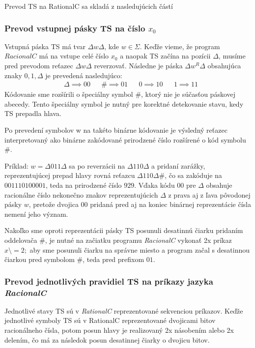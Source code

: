 \documentclass[10pt]{article}
\begin{document}
Prevod TS na RationalC sa skladá z nasledujúcich částí
\subsubsection*{Prevod vstupnej pásky TS na číslo $x_0$}
    Vstupná páska TS má tvar $\Delta w \Delta$, kde $w \in \Sigma$. Keďže vieme, že program
    $RacionalC$ má na vstupe celé číslo $x_0$ a naopak TS začína na pozícii $\Delta$, musíme
    pred prevodom reťazec $\Delta w \Delta$ reverzovať. 
    Následne je páska $\Delta w^R \Delta$ obsahujúca znaky $0,1,\Delta$ je prevedená nasledujúco:
    \begin{align*}
        &\Delta \implies 00 &  & \#  \implies 01 &
        &0 \implies 10 &  &1 \implies 11 
    \end{align*}
    Kódovanie sme rozšírili o špeciálny symbol $\#$, ktorý nie je súčasťou páskovej abecedy.
    Tento špeciálny symbol je nutný pre korektné detekovanie stavu, kedy TS prepadla hlava.

    Po prevedení symbolov w na takéto binárne kódovanie je výsledný reťazec interpretovaný ako
    binárne zakódované prirodzené číslo rozšírené o kód symbolu $\#$.

    Príklad: $w = \Delta011\Delta$ sa po reverzácii na $\Delta110\Delta$ a pridaní zarážky,
    reprezentujúcej prepad hlavy rovná reťazcu $\Delta110\Delta \#$, čo sa zakóduje na $00 11 10 10 00
    01$, teda na prirodzené číslo $929$. Vďaka kódu $00$ pre $\Delta$ obsahuje racionálne číslo nekonečno znakov
    reprezentujúcich $\Delta$ z prava aj z ľava pôvodonej pásky $w$, pretože dvojica 00 pridaná
    pred aj na koniec binárnej reprezentácie čísla nemení jeho význam.

    Nakoľko sme oproti reprezentácii pásky TS posunuli desatinnú čiarku pridaním oddelovača $\#$, je
    nutné na začiatku programu \textit{RacionalC} vykonať 2x príkaz $x \setminus = 2;$ aby sme posunuli čiarku na
    správne miesto a program začal s desatinnou čiarkou pred symbolom $\#$, teda pred prefixom $01$.

\subsubsection*{Prevod jednotlivých pravidiel TS na príkazy jazyka \textit{RacionalC}}
    Jednotlivé stavy TS sú v \textit{RationalC} reprezentované sekvenciou príkazov. 
    Keďže jednotlivé symboly TS sú v RationalC reprezentované dvojicami bitov racionálneho čísla, potom posun hlavy je
    realizovaný 2x násobením alebo 2x delením, čo má za následok posun desatinnej čiarky o
    dvojicu bitov.
\end{document}
